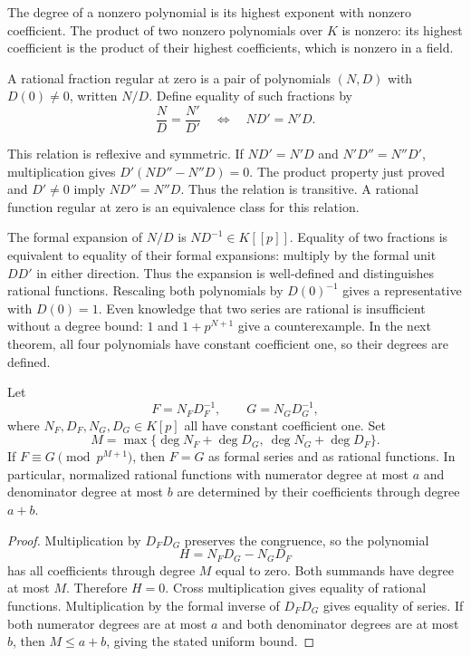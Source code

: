 The degree of a nonzero polynomial is its highest exponent with nonzero
coefficient. The product of two nonzero polynomials over $K$ is nonzero:
its highest coefficient is the product of their highest coefficients,
which is nonzero in a field.

A rational fraction regular at zero is a pair of polynomials $(N,D)$
with $D(0)\ne0$, written $N/D$.
Define equality of such fractions by
\[
 \frac ND=\frac{N'}{D'}
 \quad\Longleftrightarrow\quad ND'=N'D.
\]

This relation is reflexive and symmetric.
If $ND'=N'D$ and $N'D''=N''D'$, multiplication gives
$D'(ND''-N''D)=0$.
The product property just proved and $D'\ne0$ imply $ND''=N''D$.
Thus the relation is transitive.
A rational function regular at zero is an equivalence class for this
relation.

The formal expansion of $N/D$ is $ND^{-1}\in K[[p]]$.
Equality of two fractions is equivalent to equality of their formal
expansions: multiply by the formal unit $DD'$ in either direction.
Thus the expansion is well-defined and distinguishes rational functions.
Rescaling both polynomials by $D(0)^{-1}$ gives a representative with
$D(0)=1$.
Even knowledge that two series are rational is insufficient without a
degree bound: $1$ and $1+p^{N+1}$ give a counterexample.
In the next theorem, all four polynomials have constant coefficient one,
so their degrees are defined.

\begin{theorem}
\label{thm:pc-rational-determination}
Let
\[
 F=N_F D_F^{-1},\qquad G=N_G D_G^{-1},
\]
where $N_F,D_F,N_G,D_G\in K[p]$ all have constant coefficient one.
Set
\[
 M=\max\{\deg N_F+\deg D_G,\ \deg N_G+\deg D_F\}.
\]
If $F\equiv G\pmod{p^{M+1}}$, then $F=G$ as formal series and as
rational functions. In particular, normalized rational functions with
numerator degree at most $a$ and denominator degree at most $b$ are
determined by their coefficients through degree $a+b$.
\end{theorem}

\begin{proof}
Multiplication by $D_FD_G$ preserves the congruence, so the polynomial
\[
 H=N_FD_G-N_GD_F
\]
has all coefficients through degree $M$ equal to zero.
Both summands have degree at most $M$.
Therefore $H=0$.
Cross multiplication gives equality of rational functions.
Multiplication by the formal inverse of $D_FD_G$ gives equality of series.
If both numerator degrees are at most $a$ and both denominator degrees
are at most $b$, then $M\leq a+b$, giving the stated uniform bound.
\end{proof}

